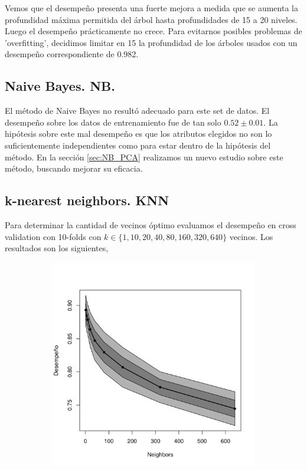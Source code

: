 \documentclass[a4paper,10pt]{article}
\begin{document}
Vemos que el desempeño presenta una fuerte mejora a medida que se aumenta la profundidad máxima 
permitida del árbol hasta profundidades de 15 a 20 niveles. Luego el desempeño 
prácticamente no crece. Para evitarnos posibles problemas de 'overfitting', 
decidimos limitar en 15 la profundidad de los árboles usados con un desempeño 
correspondiente de 0.982.

\subsection{Naive Bayes. NB.}\label{sec:NB}

El m\'etodo de Naive Bayes no result\'o adecuado para este set de datos. El desempeño sobre los datos de entrenamiento fue de tan solo $0.52 \pm 0.01$. 
La hipótesis sobre este mal desempeño es que los atributos elegidos no son lo
suficientemente independientes como para estar dentro de la hipótesis del
método. En la sección \ref{sec:NB_PCA} realizamos un nuevo estudio 
sobre este método, buscando mejorar su eficacia.

\subsection{k-nearest neighbors. KNN}

Para determinar la cantidad de vecinos \'optimo evaluamos el desempeño en cross validation con 10-folds con $k \in \{1,10,20,40,80,160,320,640\} $ vecinos. Los resultados son los siguientes, 

\begin{figure}[H]
  \centering
  \begin{subfigure}[b]{0.4\textwidth}
    \includegraphics[width=\textwidth]{../imagenes/knn-n_neighbors}
  \end{subfigure}
  \caption{}
  \label{fig:knn-n_neighbors}
\end{figure}
\end{document}
